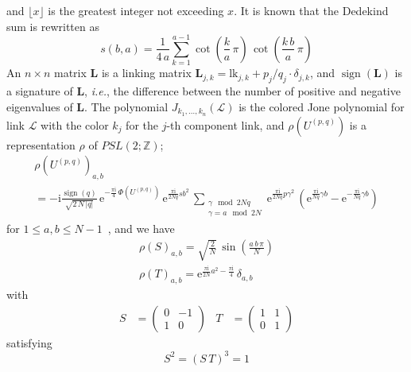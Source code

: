 \documentclass[12pt,reqno]{amsart}
\numberwithin{equation}{section}
\DeclareMathOperator{\sign}{sign}
\begin{document}
and $\lfloor x \rfloor$ is the greatest integer not exceeding $x$.
It is known that the Dedekind sum is rewritten as
\begin{equation*}
  s(b,a)
  =
  \frac{1}{4 \, a}
  \sum_{k=1}^{a-1}
  \cot \left( \frac{ k}{a}  \, \pi \right) \,
  \cot \left( \frac{ k \, b }{a} \, \pi \right) 
\end{equation*}
An $n\times n$ matrix $\mathbf{L}$ is a linking matrix
$\mathbf{L}_{j,k} = \mathrm{lk}_{j,k} + {p_j}/{q_j} \cdot \delta_{j,k}$,
and $\sign(\mathbf{L})$ is a signature of $\mathbf{L}$, \emph{i.e.},
the
difference between the number of positive and negative eigenvalues of
$\mathbf{L}$.
The  polynomial $J_{k_1,\dots,k_n}(\mathcal{L})$ is the colored Jone
polynomial for link $\mathcal{L}$ with the color $k_j$ for the $j$-th
component link, and
$\rho(U^{(p,q)})$ 
is a representation $\rho$ of $PSL(2;\mathbb{Z})$;
\begin{multline}
  \rho(U^{(p,q)})_{a,b}
  \\
  =
  - \mathrm{i} \frac{\sign(q)}{\sqrt{2 \, N \, | q|}} \,
  \mathrm{e}^{
    -\frac{\pi \mathrm{i}}{4} \, \Phi(U^{(p,q)})
  } \,
  \mathrm{e}^{
    \frac{\pi \mathrm{i}}{2 N q} s b^2 
  } \,
  \sum_{
    \substack{
      \gamma \mod 2 N q
      \\
      \gamma = a \mod 2 N}
  }
  \mathrm{e}^{
    \frac{\pi \mathrm{i}}{2 N q}
    p \gamma^2
  } \,
  \left(
    \mathrm{e}^{
      \frac{\pi \mathrm{i}}{ N q}
       \gamma b
    }
    -
    \mathrm{e}^{
      - \frac{\pi \mathrm{i}}{ N q}
      \gamma b
    }
  \right)
\end{multline}
for $1 \leq a, b \leq N-1$~\cite{LCJeff92a},
and we have
\begin{equation}
  \label{affine_su}
  \begin{gathered}
    \rho(S)_{a,b}
    =
    \sqrt{\frac{2}{N}} \,
    \sin
    \left( \frac{ a \, b \, \pi}{N} \right)
    \\[2mm]
%
    \rho(T)_{a,b}
    =
    \mathrm{e}^{\frac{\pi \mathrm{i}}{2 N} a^2 - \frac{\pi \mathrm{i}}{4}}
    \,
    \delta_{a,b}
  \end{gathered}
\end{equation}
with
\begin{align}
  \label{PSL_ST}
  S
  &=
  \begin{pmatrix}
    0 & -1 \\
    1 & 0
  \end{pmatrix}
  &
  T 
  & =
  \begin{pmatrix}
    1 & 1 \\
    0 & 1
  \end{pmatrix}
\end{align}
satisfying
\begin{equation*}
  S^2 = (S \, T)^3 = 1
\end{equation*}
\end{document}
